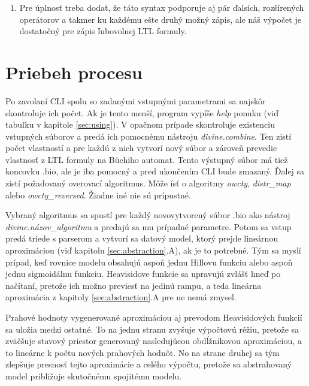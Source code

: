 \documentclass[11pt,final,oneside]{fithesis}
\begin{document}
\begin{enumerate}
\begin{itemize}
disjunkcia, {\bf ->} -- implik\'acia, {\bf <->} -- ekvivalencia) a premenn\'ymi definovan\'ymi na za\v ciatku s\'uboru.
\item Syntax podporuje aj \v lubovolne vnoren\'e gu\v lat\'e  z\'atvorky.
\end{itemize}
\item Pre \'uplnos\v t treba doda\v t, \v ze t\'ato syntax podporuje aj p\'ar \v dals\'ich, roz\v s\'iren\'ych oper\'atorov a takmer ku ka\v zd\'emu e\v ste
druh\'y mo\v zn\'y z\'apis, ale n\'a\v s v\'ypo\v cet je dostato\v cn\'y pre z\'apis \v lubovolnej LTL formuly.
\end{enumerate}

\section{Priebeh procesu}
Po zavolan\'i CLI spolu so zadan\'ymi vstupn\'ymi parametrami sa najsk\^ or skontroluje ich po\v cet. Ak je tento men\v s\'i, program vyp\'i\v se \textit{help}
ponuku (vi\v d tabu\v lku v kapitole \ref{sec:using}). V opa\v cnom pr\'ipade skontroluje existenciu vstupn\'ych s\'uborov a pred\'a ich pomocn\'emu n\'astroju {\it divine.combine}.
Ten zist\'i po\v cet vlastnost\'i a pre ka\v zd\'u z nich vytvor\'i nov\'y s\'ubor a z\'arove\v n prevedie vlastnos\v t z LTL formuly na B\"uchiho automat. 
Tento v\'ystupn\'y s\'ubor m\'a tie\v z koncovku .bio, ale je iba pomocn\'y a pred ukon\v cen\'im CLI bude zmazan\'y. \v Dalej sa zist\'i po\v zadovan\'y 
overovac\'i algoritmus. M\^ o\v ze \'is\v t o algoritmy {\it owcty}, {\it distr\_map} alebo {\it owcty\_reversed}. \v Ziadne in\'e nie s\'u pr\'ipustn\'e.

Vybran\'y algoritmus sa spust\'i pre ka\v zd\'y novovytvoren\'y s\'ubor .bio ako n\'astroj {\it divine.n\'azov\_algoritmu} a predaj\'u sa mu pr\'ipadn\'e 
parametre. Potom sa vstup pred\'a triede s parserom a vytvor\'i sa datov\'y model, ktor\'y prejde line\'arnou aproxim\'aciou (vi\v d kapitolu 
\ref{sec:abstraction}.A), ak je to potrebn\'e. T\'ym sa
mysl\'i pr\'ipad, ke\v d rovnice modelu obsahuj\'u aspo\v n jednu Hillovu funkciu alebo aspo\v n jednu sigmoid\'alnu funkciu. Heavisidove funkcie sa 
upravuj\'u zvl\'a\v s\v t hne\v d po na\v c\'itan\'i, preto\v ze ich mo\v zno previes\v t na jedin\'u rampu, a teda line\'arna aproxim\'acia z kapitoly
\ref{sec:abstraction}.A pre ne nem\'a zmysel. 

Prahov\'e hodnoty vygenerovan\'e aproxim\'aciou aj prevodom Heavisidov\'ych funkci\'i sa ulo\v zia medzi ostatn\'e. To na jednu stranu zvy\v suje 
v\'ypo\v ctov\'u r\'e\v ziu, preto\v ze sa zv\" a\v c\v suje stavov\'y priestor generovan\'y nasleduj\'ucou obd\'l\v znikovou aproxim\'aciou, a to line\'arne 
k po\v ctu nov\'ych prahov\'ych hodn\^ ot. No na strane druhej sa t\'ym zlep\v suje presnos\v t tejto aproxim\'acie a cel\'eho v\'ypo\v ctu, preto\v ze sa 
abstrahovan\'y model pribli\v zuje skuto\v cn\'emu spojit\'emu modelu.
\end{document}
